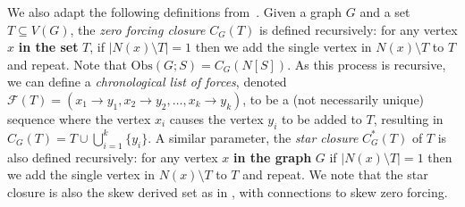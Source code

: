 \documentclass{article}
\begin{document}
        We also adapt the following definitions from~\cite{DH2006}. 
        Given a graph $G$ and a set $T\subseteq V(G)$, the \emph{zero forcing closure} $C_G(T)$ is defined recursively: for any vertex $x$ \textbf{in the set} $T$, if $|N(x)\setminus T|=1$ then we add the single vertex in $N(x)\setminus T$ to $T$ and repeat.
        Note that $\mathrm{Obs}(G;S)=C_G(N[S])$.
        As this process is recursive, we can define a \emph{chronological list of forces}, denoted $\mathcal{F}(T) =(x_1\to y_1, x_2\to y_2,\dots,x_k\to y_k)$, to be a (not necessarily unique) sequence where the vertex $x_i$ causes the vertex $y_i$ to be added to $T$, resulting in $C_G(T)=T\cup \bigcup_{i=1}^k \{y_i\}.$
        A similar parameter, the \emph{star closure} $C^*_G(T)$ of $T$ is also defined recursively: for any vertex $x$ \textbf{in the graph} $G$ if $|N(x)\setminus T|=1$ then we add the single vertex in $N(x)\setminus T$ to $T$ and repeat.
        We note that the star closure is also the skew derived set as in \cite{IMA2010}, with connections to skew zero forcing.
\end{document}
